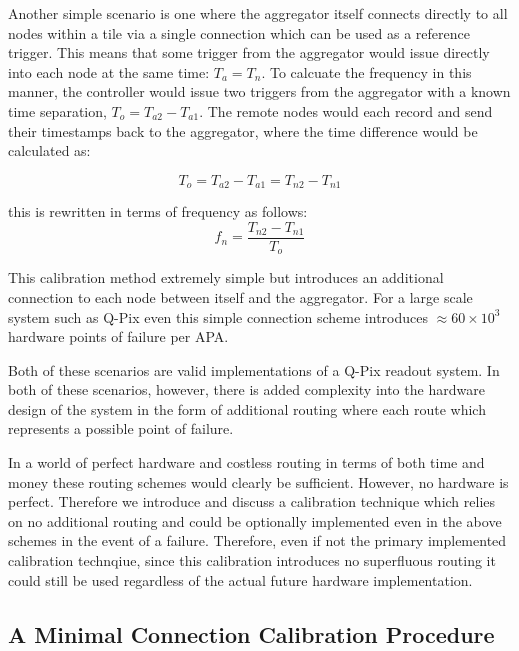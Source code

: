 Another simple scenario is one where the aggregator itself connects directly to all nodes within a tile via a single connection which can be used as a reference trigger.
This means that some trigger from the aggregator would issue directly into each node at the same time: $T_{a} = T_{n}$.
To calcuate the frequency in this manner, the controller would issue two triggers from the aggregator with a known time separation, $T_{o} = T_{a2} - T_{a1}$.
The remote nodes would each record and send their timestamps back to the aggregator, where the time difference would be calculated as:

\begin{equation}
  T_{o} = T_{a2} - T_{a1} = T_{n2} - T_{n1}
\end{equation}

this is rewritten in terms of frequency as follows:
\begin{equation}
  f_{n} = \frac{T_{n2} - T_{n1}}{T_{o}}
\end{equation}

This calibration method extremely simple but introduces an additional connection to each node between itself and the aggregator.
For a large scale system such as Q-Pix even this simple connection scheme introduces $\approx 60\times 10^{3}$ hardware points of failure per APA.

Both of these scenarios are valid implementations of a Q-Pix readout system.
In both of these scenarios, however, there is added complexity into the hardware design of the system in the form of additional routing where each route which represents a possible point of failure.

In a world of perfect hardware and costless routing in terms of both time and money these routing schemes would clearly be sufficient.
However, no hardware is perfect.
Therefore we introduce and discuss a calibration technique which relies on no additional routing and could be optionally implemented even in the above schemes in the event of a failure.
Therefore, even if not the primary implemented calibration technqiue, since this calibration introduces no superfluous routing it could still be used regardless of the actual future hardware implementation.

\subsection{A Minimal Connection Calibration Procedure}~\label{sec:min_calib}

